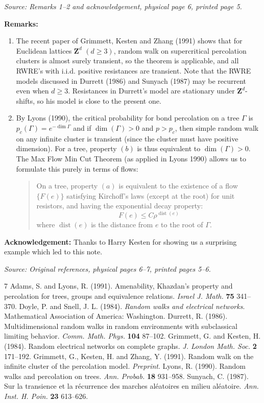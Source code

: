 \documentclass[11pt]{article}
\newcommand{\src}[1]{\par\smallskip\noindent\textit{Source: #1.}\par\nopagebreak[4]\smallskip}
\begin{document}
\src{Remarks 1--2 and acknowledgement, physical page 6, printed page 5}
\noindent\textbf{Remarks:}
\begin{enumerate}
\item The recent paper of Grimmett, Kesten and Zhang (1991) shows that for
Euclidean lattices $\mathbf Z^d$ $(d\geq3)$, random walk on supercritical
percolation clusters is almost surely transient, so the theorem is
applicable, and all RWRE's with i.i.d. positive resistances are transient.
Note that the RWRE models discussed in Durrett (1986) and Sunyach (1987)
may be recurrent even when $d\geq3$. Resistances in Durrett's model are
stationary under $\mathbf Z^d$-shifts, so his model is close to the present one.
\item By Lyons (1990), the critical probability for bond percolation on a
tree $\Gamma$ is $p_c(\Gamma)=e^{-\dim\Gamma}$ and if $\dim(\Gamma)>0$
and $p>p_c$, then simple random walk on any infinite cluster is transient
(since the cluster must have positive dimension). For a tree, property
$(b)$ is thus equivalent to $\dim(\Gamma)>0$. The Max Flow Min Cut Theorem
(as applied in Lyons 1990) allows us to formulate this purely in terms of flows:
\begin{quote}
On a tree, property $(a)$ is equivalent to the existence of a flow $\{F(e)\}$
satisfying Kirchoff's laws (except at the root) for unit resistors, and
having the exponential decay property:
\[
F(e)\leq C\rho^{\operatorname{dist}(e)}
\]
where $\operatorname{dist}(e)$ is the distance from $e$ to the root of $\Gamma$.
\end{quote}
\end{enumerate}
\noindent\textbf{Acknowledgement:} Thanks to Harry Kesten for showing us a
surprising example which led to this note.

\src{Original references, physical pages 6--7, printed pages 5--6}
\begin{thebibliography}{7}
 Adams, S. and Lyons, R. (1991). Amenability, Khazdan's property
and percolation for trees, groups and equivalence relations.
\emph{Israel J. Math.} \textbf{75} 341--370.
 Doyle, P. and Snell, J. L. (1984).
\emph{Random walks and electrical networks}.
Mathematical Association of America: Washington.
 Durrett, R. (1986). Multidimensional random walks in random
environments with subclassical limiting behavior.
\emph{Comm. Math. Phys.} \textbf{104} 87--102.
 Grimmett, G. and Kesten, H. (1984). Random electrical networks
on complete graphs. \emph{J. London Math. Soc.} \textbf{2} 171--192.
 Grimmett, G., Kesten, H. and Zhang, Y. (1991).
Random walk on the infinite cluster of the percolation model. \emph{Preprint}.
 Lyons, R. (1990). Random walks and percolation on trees.
\emph{Ann. Probab.} \textbf{18} 931--958.
 Sunyach, C. (1987). Sur la transience et la r\'ecurrence des
marches al\'eatoires en milieu al\'eatoire.
\emph{Ann. Inst. H. Poin.} \textbf{23} 613--626.
\end{thebibliography}
\end{document}
